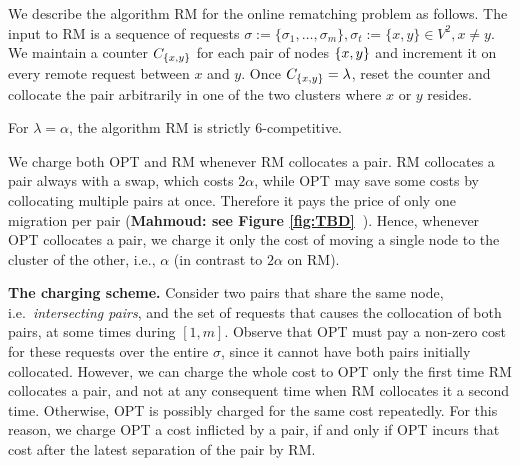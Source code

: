 \documentclass[a4paper,anonymous,USenglish]{lipics-v2019}
\newcommand{\OPT}{\textsc{OPT}\xspace}
\newcommand{\RM}{\textsc{RM}\xspace} %
\DeclarePairedDelimiter\set{\{}{\}}
\newcommand\mahmoud[1]{\color{orange}\textbf{Mahmoud: #1~}\color{black}}
\begin{document}
We describe the algorithm \RM for the online rematching problem as follows.
The input to \RM is a sequence of  requests
$\sigma:=\{\sigma_1,\dots, \sigma_m\}, \sigma_t:=\{x,y\} \in V^2, x \neq y$.
We maintain a counter $C_{\set{x,y}}$ for each pair of nodes $\set{x,y}$ and increment it on every remote request between $x$ and $y$.
Once $C_{\set{x,y}} = \lambda$,
reset the counter and collocate the pair arbitrarily in one of the two clusters where $x$ or $y$ resides.

\begin{theorem} \label{thm:k=2}
	For $\lambda=\alpha$, the algorithm \RM  is strictly 6-competitive.
\end{theorem}


We charge both \OPT and \RM whenever \RM collocates a pair.%
\RM collocates a pair always with a swap,%
which  costs $2\alpha$,
while OPT may save some costs by collocating multiple pairs at once.
 Therefore it pays the price of only one migration per pair  (\mahmoud{see Figure \ref{fig:TBD}}).
Hence,
whenever \OPT collocates a pair,
we charge it only the cost of moving a single node to the cluster of the other,
i.e., $\alpha$ (in contrast to $2\alpha$ on \RM).

\textbf{The charging scheme.}
Consider two  pairs that share the same node, 
i.e.~\emph{intersecting pairs},
and the set of requests that causes the collocation of both pairs,
at some  times during  $[1,m]$.
Observe that \OPT must pay a non-zero cost
for these requests over the entire $\sigma$,
since it cannot have both pairs initially collocated.
However,
we can charge the whole cost to \OPT only the first time \RM collocates a pair,
and not at any consequent time when \RM collocates it a second time.
Otherwise,
 \OPT is possibly charged for the same cost repeatedly.
For this reason,
we charge \OPT a cost inflicted by a pair,
if and only if  \OPT incurs that cost after the latest separation of the pair by \RM.
\end{document}
